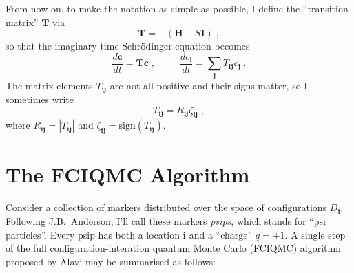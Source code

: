 \documentclass{article}
\newcommand{\bi}{\boldsymbol{i}}
\newcommand{\bj}{\boldsymbol{j}}
\newcommand{\bH}{\boldsymbol{H}}
\newcommand{\bT}{\boldsymbol{T}}
\newcommand{\bc}{\boldsymbol{c}}
\newcommand{\bI}{\boldsymbol{I}}
\begin{document}
From now on, to make the notation as simple as possible, I define the
``transition matrix'' $\bT$ via
\begin{displaymath}
\bT = -(\bH - S \bI) \;,
\end{displaymath}
so that the imaginary-time Schr\"{o}dinger equation becomes
\begin{displaymath}
\frac{d\bc}{dt} = \bT \bc \;, \;\;\;\;\;\;\;\;\;
\frac{dc_{\bi}}{dt} = \sum_{\bj} T_{\bi\bj} c_{\bj} \;.
\end{displaymath}
The matrix elements $T_{\bi\bj}$ are not all positive and their signs
matter, so I sometimes write
\begin{displaymath}
T_{\bi\bj} = R_{\bi\bj} \zeta_{\bi\bj} \;,
\end{displaymath}
where $R_{\bi\bj} = |T_{\bi\bj}|$ and $\zeta_{\bi\bj} = \mbox{sign}(
T_{\bi\bj} )$.

\section{The FCIQMC Algorithm}
\label{sec:FCIQMCAlgorithm}

Consider a collection of markers distributed over the space of
configurations $D_{\bi}$. Following J.B.\ Anderson, I'll call these
markers \emph{psips}, which stands for ``psi particles''. Every psip
has both a location $\bi$ and a ``charge'' $q = \pm 1$. A single step
of the full configuration-interation quantum Monte Carlo (FCIQMC)
algorithm proposed by Alavi may be summarised as follows:
\end{document}
